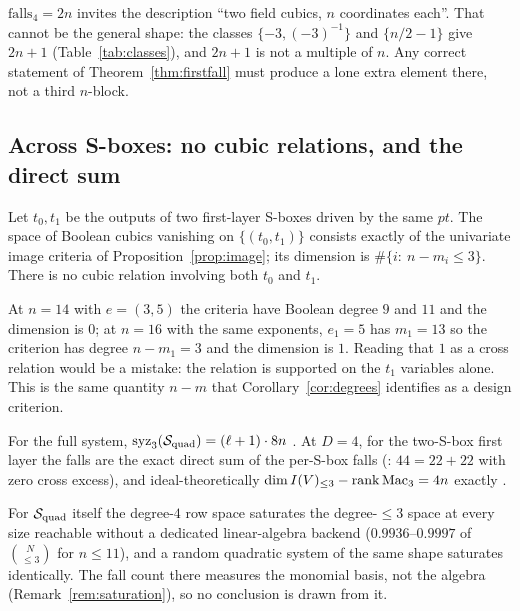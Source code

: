 \begin{remark}\label{rem:obstruction}
$\mathrm{falls}_4=2n$ invites the description ``two field cubics, $n$ coordinates each''. That cannot
be the general shape: the classes $\{-3,(-3)^{-1}\}$ and $\{n/2-1\}$ give $2n+1$
(Table~\ref{tab:classes}), and $2n+1$ is not a multiple of $n$. Any correct statement of
Theorem~\ref{thm:firstfall} must produce a lone extra element there, not a third $n$-block.
\end{remark}

\subsection{Across S-boxes: no cubic relations, and the direct sum}

\begin{theorem}\label{thm:cross}
 Let $t_0,t_1$ be the outputs of two first-layer S-boxes driven by the same $pt$.
The space of Boolean cubics vanishing on $\{(t_0,t_1)\}$ consists exactly of the univariate image
criteria of Proposition~\ref{prop:image}; its dimension is $\#\{i:\ n-m_i\le3\}$. There is no cubic
relation involving both $t_0$ and $t_1$.
\end{theorem}
\begin{remark}
At $n=14$ with $e=(3,5)$ the criteria have Boolean degree $9$ and $11$ and the dimension is $0$; at
$n=16$ with the same exponents, $e_1=5$ has $m_1=13$ so the criterion has degree $n-m_1=3$ and the
dimension is $1$. Reading that $1$ as a cross relation would be a mistake: the relation is supported
on the $t_1$ variables alone. This is the same quantity $n-m$ that Corollary~\ref{cor:degrees}
identifies as a design criterion.
\end{remark}

\begin{theorem}\label{thm:directsum}
For the full system, $\operatorname{syz}_3(\mathcal{S}_{\mathrm{quad}})=(\ell+1)\cdot 8n$ . At $D=4$,
for the two-S-box first layer the falls are the exact direct sum of the per-S-box falls
(: $44=22+22$ with zero cross excess), and ideal-theoretically
$\dim I(V)_{\le3}-\operatorname{rank}\mathrm{Mac}_3=4n$ exactly .
\end{theorem}

\begin{remark}\label{rem:e04}
For $\mathcal{S}_{\mathrm{quad}}$ itself the degree-$4$ row space saturates the degree-$\le3$ space at every size
reachable without a dedicated linear-algebra backend ($0.9936$--$0.9997$ of $\binom{N}{\le3}$ for
$n\le11$), and a random quadratic system of the same shape saturates identically. The fall count
there measures the monomial basis, not the algebra (Remark~\ref{rem:saturation}), so no conclusion is
drawn from it. 
\end{remark}

